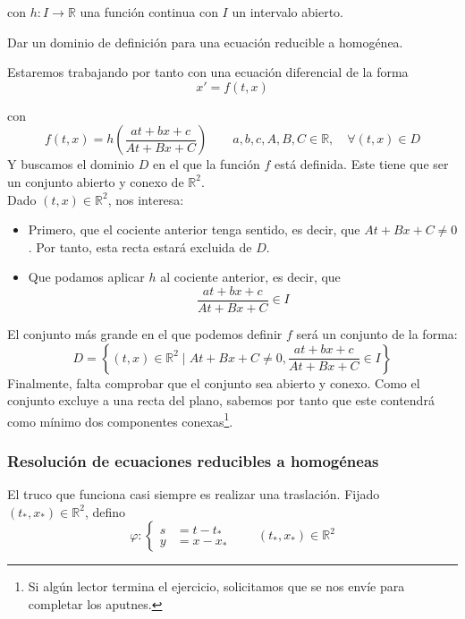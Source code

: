 con $h:I\rightarrow\mathbb{R}$ una función continua con $I$ un intervalo abierto.

\begin{ejercicio*}
    Dar un dominio de definición para una ecuación reducible a homogénea.

Estaremos trabajando por tanto con una ecuación diferencial de la forma
\begin{equation*}
    x' = f(t,x)
\end{equation*}

con
\begin{equation*}
    f(t,x) = h\left(\dfrac{at + bx + c}{At + Bx + C}\right) \qquad a,b,c,A,B,C \in \mathbb{R}, \quad \forall (t,x)\in D
\end{equation*}
Y buscamos el dominio $D$ en el que la función $f$ está definida. Este tiene que ser un conjunto abierto y conexo de $\mathbb{R}^2$.\\

Dado $(t,x)\in \mathbb{R}^2$, nos interesa:
\begin{itemize}
    \item Primero, que el cociente anterior tenga sentido, es decir, que $At + Bx + C \neq 0$. Por tanto, esta recta estará excluida de $D$.
    \item Que podamos aplicar $h$ al cociente anterior, es decir, que
        \begin{equation*}
            \dfrac{at + bx + c }{At + Bx + C} \in I
        \end{equation*}
\end{itemize}
El conjunto más grande en el que podemos definir $f$ será un conjunto de la forma:
\begin{equation*}
    D = \left\{(t,x)\in \mathbb{R}^2 \mid At + Bx + C \neq 0, \dfrac{at + bx + c }{At + Bx + C} \in I \right\}
\end{equation*}
Finalmente, falta comprobar que el conjunto sea abierto y conexo. Como el conjunto excluye a una recta del plano, sabemos por tanto que este contendrá como mínimo dos componentes conexas\footnote{Si algún lector termina el ejercicio, solicitamos que se nos envíe para completar los aputnes.}.
\end{ejercicio*}

\subsubsection{Resolución de ecuaciones reducibles a homogéneas}
\noindent
El truco que funciona casi siempre es realizar una traslación. Fijado $(t_*, x_*)\in \mathbb{R}^2$, defino
\begin{equation*}
    \varphi: \left\{\begin{array}{rl}
            s &= t - t_* \\
            y &= x - x_*
    \end{array}\right. \qquad (t_*, x_*)\in \mathbb{R}^2
\end{equation*}

